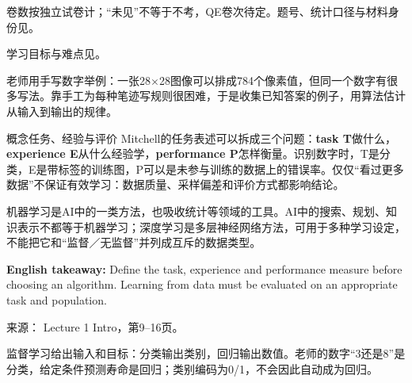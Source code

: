 卷数按独立试卷计；“未见”不等于不考，QE卷次待定。题号、统计口径与材料身份见。

学习目标与难点见。








老师用手写数字举例：一张28\ensuremath{\times}28图像可以排成784个像素值，但同一个数字有很多写法。靠手工为每种笔迹写规则很困难，于是收集已知答案的例子，用算法估计从输入到输出的规律。






\begin{StudyBlock}{概念}{任务、经验与评价}
Mitchell的任务表述可以拆成三个问题：\textbf{task T}做什么，\textbf{experience E}从什么经验学，\textbf{performance P}怎样衡量。识别数字时，T是分类，E是带标签的训练图，P可以是未参与训练的数据上的错误率。仅仅“看过更多数据”不保证有效学习：数据质量、采样偏差和评价方式都影响结论。
\end{StudyBlock}


机器学习是AI中的一类方法，也吸收统计等领域的工具。AI中的搜索、规划、知识表示不都等于机器学习；深度学习是多层神经网络方法，可用于多种学习设定，不能把它和“监督／无监督”并列成互斥的数据类型。


\textbf{English takeaway:} Define the task, experience and performance measure before choosing an algorithm. Learning from data must be evaluated on an appropriate task and population.


来源： Lecture 1 Intro，第9–16页。








监督学习给出输入和目标：分类输出类别，回归输出数值。老师的数字“3还是8”是分类，给定条件预测寿命是回归；类别编码为0/1，不会因此自动成为回归。


